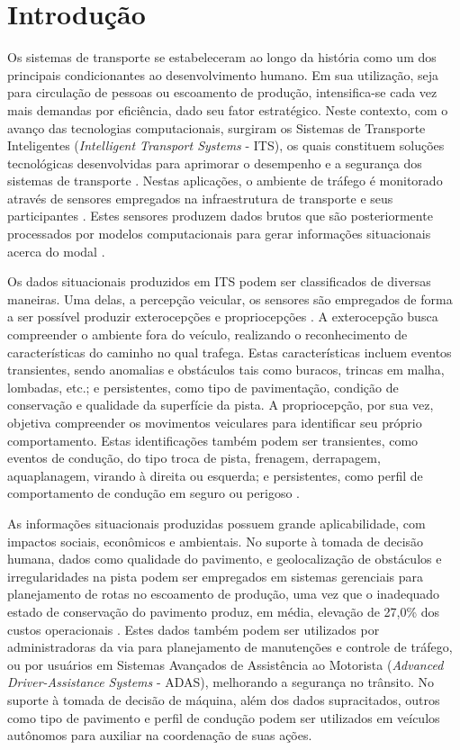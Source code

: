 \chapter{Introdução}
\label{cap:introducao}

Os sistemas de transporte se estabeleceram ao longo da história como um dos principais condicionantes ao desenvolvimento humano. Em sua utilização, seja para circulação de pessoas ou escoamento de produção, intensifica-se cada vez mais demandas por eficiência, dado seu fator estratégico. Neste contexto, com o avanço das tecnologias computacionais, surgiram os Sistemas de Transporte Inteligentes (\textit{Intelligent Transport Systems} - ITS), os quais constituem soluções tecnológicas desenvolvidas para aprimorar o desempenho e a segurança dos sistemas de transporte \cite{Zhang2011,Aragon2016}. Nestas aplicações, o ambiente de tráfego é monitorado através de sensores empregados na infraestrutura de transporte e seus participantes \cite{Zhang2011,mathew2014a,mathew2014b}. Estes sensores produzem dados brutos que são posteriormente processados por modelos computacionais para gerar informações situacionais acerca do modal \cite{Zhang2011}.

Os dados situacionais produzidos em ITS podem ser classificados de diversas maneiras. Uma delas, a percepção veicular, os sensores são empregados de forma a ser possível produzir exterocepções e propriocepções \cite{menegazzo2020}. A exterocepção busca compreender o ambiente fora do veículo, realizando o reconhecimento de características do caminho no qual trafega. Estas características incluem eventos transientes, sendo anomalias e obstáculos tais como buracos, trincas em malha, lombadas, etc.; e persistentes, como tipo de pavimentação, condição de conservação e qualidade da superfície da pista. A propriocepção, por sua vez, objetiva compreender os movimentos veiculares para identificar seu próprio comportamento. Estas identificações também podem ser transientes, como eventos de condução, do tipo troca de pista, frenagem, derrapagem, aquaplanagem, virando à direita ou esquerda; e persistentes, como perfil de comportamento de condução em seguro ou perigoso \cite{menegazzo2018,menegazzo2020}.

As informações situacionais produzidas possuem grande aplicabilidade, com impactos sociais, econômicos e ambientais. No suporte à tomada de decisão humana, dados como qualidade do pavimento, e geolocalização de obstáculos e irregularidades na pista podem ser empregados em sistemas gerenciais para planejamento de rotas no escoamento de produção, uma vez que o inadequado estado de conservação do pavimento produz, em média, elevação de 27,0\% dos custos operacionais \cite{CNT2017}. Estes dados também podem ser utilizados por administradoras da via para planejamento de manutenções e controle de tráfego, ou por usuários em Sistemas Avançados de Assistência ao Motorista (\textit{Advanced Driver-Assistance Systems} - ADAS), melhorando a segurança no trânsito. No suporte à tomada de decisão de máquina, além dos dados supracitados, outros como tipo de pavimento e perfil de condução podem ser utilizados em veículos autônomos para auxiliar na coordenação de suas ações.

